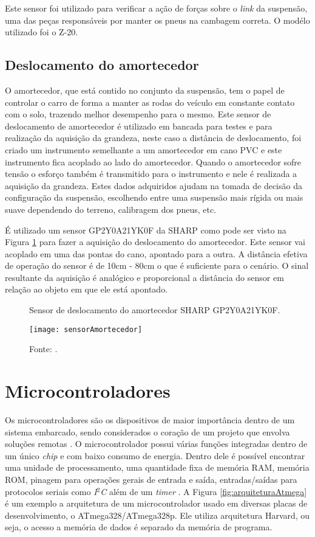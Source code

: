 Este sensor foi utilizado para verificar a ação de forças sobre o \textit{link} da suspensão, uma das peças responsáveis por manter os pneus na cambagem correta. O modélo utilizado foi o Z-20.   

\subsection{Deslocamento do amortecedor}

O amortecedor, que está contido no conjunto da suspensão, tem o papel de controlar o carro de forma a manter as rodas do veículo em constante contato com o solo, trazendo melhor desempenho para o mesmo. Este sensor de deslocamento de amortecedor é utilizado em bancada para testes e para realização da aquisição da grandeza, neste caso a distância de deslocamento, foi criado um instrumento semelhante a um amortecedor em cano PVC e este instrumento fica acoplado ao lado do amortecedor. Quando o amortecedor sofre tensão o esforço também é transmitido para o instrumento e nele é realizada a aquisição da grandeza. Estes dados adquiridos ajudam na tomada de decisão da configuração da suspensão, escolhendo entre uma suspensão mais rígida ou mais suave dependendo do terreno, calibragem dos pneus, etc.

É utilizado um sensor GP2Y0A21YK0F da SHARP como pode ser visto na Figura \ref{fig:sensorAmortecedor} para fazer a aquisição do deslocamento do amortecedor. Este sensor vai acoplado em uma das pontas do cano, apontado para a outra. A distância efetiva de operação do sensor é de 10cm - 80cm \cite{SHARP} o que é suficiente para o cenário. O sinal resultante da aquisição é analógico e proporcional a distância do sensor em relação ao objeto em que ele está apontado. 


\begin{figure}[!htb]
	\centering
		\caption{Sensor de deslocamento do amortecedor SHARP GP2Y0A21YK0F.}
		\texttt{[image: sensorAmortecedor]} 
		\caption*{Fonte: \cite{SHARP}.}
		\label{fig:sensorAmortecedor}
\end{figure} 


\section{Microcontroladores}
\label{sec:microcontroladores}

Os microcontroladores são os dispositivos de maior importância dentro de um sistema embarcado, sendo considerados o coração de um projeto que envolva soluções remotas \cite{aSurveyTo2010}. O microcontrolador possui várias funções integradas dentro de um único \textit{chip} e com baixo consumo de energia. Dentro dele é possível encontrar uma unidade de processamento, uma quantidade fixa de memória RAM, memória ROM, pinagem para operações gerais de entrada e saída, entradas/saídas para protocolos seriais como \textit{I$^2$C} além de um \textit{timer} \cite{mazidi2008pic}. A Figura \ref{fig:arquiteturaAtmega} é um exemplo a arquitetura de um microcontrolador usado em diversas placas de desenvolvimento, o ATmega328/ATmega328p. Ele utiliza arquitetura Harvard, ou seja, o acesso a memória de dados é separado da memória de programa.        


